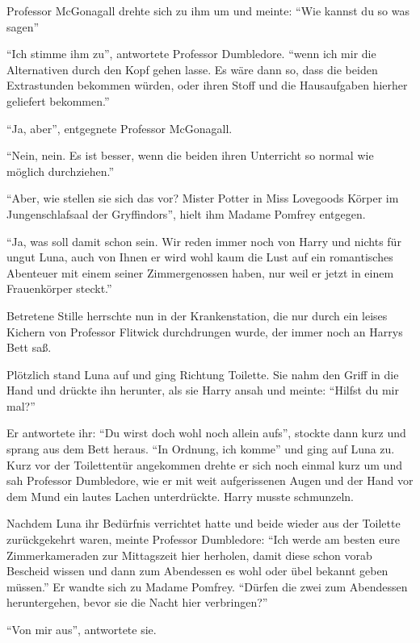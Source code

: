 Professor McGonagall drehte sich zu ihm um und meinte: \enquote{Wie kannst du so was sagen\abs}

\enquote{Ich stimme ihm zu}, antwortete Professor Dumbledore. \enquote{wenn ich mir die Alternativen durch den Kopf gehen lasse. Es wäre dann so, dass die beiden Extrastunden bekommen würden, oder ihren Stoff und die Hausaufgaben hierher geliefert bekommen.}

\enquote{Ja, aber}, entgegnete Professor McGonagall.

\enquote{Nein, nein. Es ist besser, wenn die beiden ihren Unterricht so normal wie möglich durchziehen.}

\enquote{Aber, wie stellen sie sich das vor? Mister Potter in Miss Lovegoods Körper im Jungenschlafsaal der Gryffindors}, hielt ihm Madame Pomfrey entgegen.

\enquote{Ja, was soll damit schon sein. Wir reden immer noch von Harry \gst und nichts für ungut Luna, auch von Ihnen \gst er wird wohl kaum die Lust auf ein romantisches Abenteuer mit einem seiner Zimmergenossen haben, nur weil er jetzt in einem Frauenkörper steckt.}

Betretene Stille herrschte nun in der Krankenstation, die nur durch ein leises Kichern von Professor Flitwick durchdrungen wurde, der immer noch an Harrys Bett saß.

Plötzlich stand Luna auf und ging Richtung Toilette. Sie nahm den Griff in die Hand und drückte ihn herunter, als sie Harry ansah und meinte: \enquote{Hilfst du mir mal?}

Er antwortete ihr: \enquote{Du wirst doch wohl noch allein aufs\abs}, stockte dann kurz und sprang aus dem Bett heraus. \enquote{In Ordnung, ich komme} und ging auf Luna zu. Kurz vor der Toilettentür angekommen drehte er sich noch einmal kurz um und sah Professor Dumbledore, wie er mit weit aufgerissenen Augen und der Hand vor dem Mund ein lautes Lachen unterdrückte. Harry musste schmunzeln.

Nachdem Luna ihr Bedürfnis verrichtet hatte und beide wieder aus der Toilette zurückgekehrt waren, meinte Professor Dumbledore: \enquote{Ich werde am besten eure Zimmerkameraden zur Mittagszeit hier herholen, damit diese schon vorab Bescheid wissen und dann zum Abendessen es wohl oder übel bekannt geben müssen.} Er wandte sich zu Madame Pomfrey. \enquote{Dürfen die zwei zum Abendessen heruntergehen, bevor sie die Nacht hier verbringen?}

\enquote{Von mir aus}, antwortete sie.


